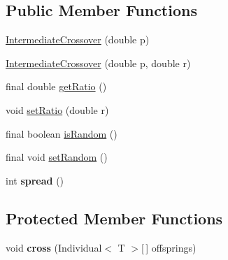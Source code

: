 \subsection*{Public Member Functions}
\begin{DoxyCompactItemize}
\item 
\hyperlink{classjenes_1_1stage_1_1operator_1_1common_1_1_intermediate_crossover_3_01_t_01extends_01_double_chromosome_01_4_a79954756cd6cd0ffc58cd4dfbee77ca3}{Intermediate\-Crossover} (double p)
\item 
\hyperlink{classjenes_1_1stage_1_1operator_1_1common_1_1_intermediate_crossover_3_01_t_01extends_01_double_chromosome_01_4_a1e108f61a2e8e654e65162ef8833441f}{Intermediate\-Crossover} (double p, double r)
\item 
final double \hyperlink{classjenes_1_1stage_1_1operator_1_1common_1_1_intermediate_crossover_3_01_t_01extends_01_double_chromosome_01_4_a5b3f99723d401833db13476b27072985}{get\-Ratio} ()
\item 
void \hyperlink{classjenes_1_1stage_1_1operator_1_1common_1_1_intermediate_crossover_3_01_t_01extends_01_double_chromosome_01_4_a1ed8c3472bcf1d00bebcb5f5e4f4988a}{set\-Ratio} (double r)
\item 
final boolean \hyperlink{classjenes_1_1stage_1_1operator_1_1common_1_1_intermediate_crossover_3_01_t_01extends_01_double_chromosome_01_4_aaed91a2488a595ef3033be9b87f7a6d1}{is\-Random} ()
\item 
final void \hyperlink{classjenes_1_1stage_1_1operator_1_1common_1_1_intermediate_crossover_3_01_t_01extends_01_double_chromosome_01_4_a7e3eb40cb2a7db9c3a80c98547cce253}{set\-Random} ()
\item 
\hypertarget{classjenes_1_1stage_1_1operator_1_1common_1_1_intermediate_crossover_3_01_t_01extends_01_double_chromosome_01_4_a4007c5dca65a48c2ea6dfbcc2372a0b2}{int {\bfseries spread} ()}\label{classjenes_1_1stage_1_1operator_1_1common_1_1_intermediate_crossover_3_01_t_01extends_01_double_chromosome_01_4_a4007c5dca65a48c2ea6dfbcc2372a0b2}

\end{DoxyCompactItemize}
\subsection*{Protected Member Functions}
\begin{DoxyCompactItemize}
\item 
\hypertarget{classjenes_1_1stage_1_1operator_1_1common_1_1_intermediate_crossover_3_01_t_01extends_01_double_chromosome_01_4_a712aa913c166a008a0833358270cd483}{void {\bfseries cross} (Individual$<$ T $>$\mbox{[}$\,$\mbox{]} offsprings)}\label{classjenes_1_1stage_1_1operator_1_1common_1_1_intermediate_crossover_3_01_t_01extends_01_double_chromosome_01_4_a712aa913c166a008a0833358270cd483}

\end{DoxyCompactItemize}
